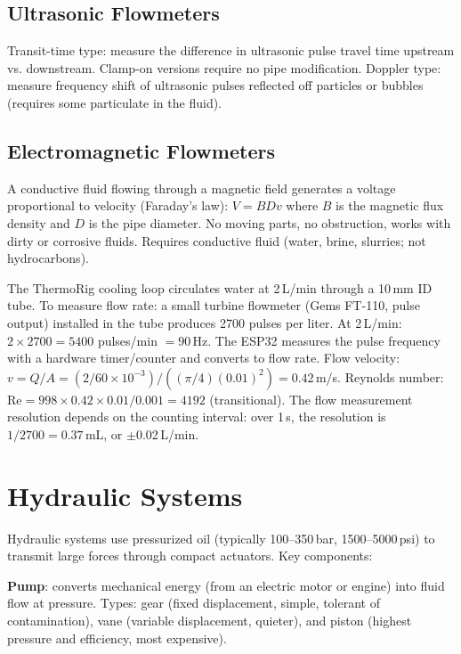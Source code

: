 \documentclass[11pt,letterpaper,twoside,openany]{book}
\begin{document}
\subsection{Ultrasonic Flowmeters}
Transit-time type: measure the difference in ultrasonic pulse travel time upstream vs. downstream. Clamp-on versions require no pipe modification. Doppler type: measure frequency shift of ultrasonic pulses reflected off particles or bubbles (requires some particulate in the fluid).

\subsection{Electromagnetic Flowmeters}
A conductive fluid flowing through a magnetic field generates a voltage proportional to velocity (Faraday's law): $V = BDv$ where $B$ is the magnetic flux density and $D$ is the pipe diameter. No moving parts, no obstruction, works with dirty or corrosive fluids. Requires conductive fluid (water, brine, slurries; not hydrocarbons).

\begin{examplebox}
The ThermoRig cooling loop circulates water at 2\,L/min through a 10\,mm ID tube. To measure flow rate: a small turbine flowmeter (Gems FT-110, pulse output) installed in the tube produces 2700 pulses per liter. At 2\,L/min: $2 \times 2700 = 5400$ pulses/min $= 90$\,Hz. The ESP32 measures the pulse frequency with a hardware timer/counter and converts to flow rate. Flow velocity: $v = Q/A = (2/60 \times 10^{-3})/((\pi/4)(0.01)^2) = 0.42$\,m/s. Reynolds number: $\text{Re} = 998 \times 0.42 \times 0.01/0.001 = 4192$ (transitional). The flow measurement resolution depends on the counting interval: over 1\,s, the resolution is $1/2700 = 0.37$\,mL, or $\pm$0.02\,L/min.
\end{examplebox}

\section{Hydraulic Systems}

Hydraulic systems use pressurized oil (typically 100--350\,bar, 1500--5000\,psi) to transmit large forces through compact actuators. Key components:

\textbf{Pump}: converts mechanical energy (from an electric motor or engine) into fluid flow at pressure. Types: gear (fixed displacement, simple, tolerant of contamination), vane (variable displacement, quieter), and piston (highest pressure and efficiency, most expensive).
\end{document}
